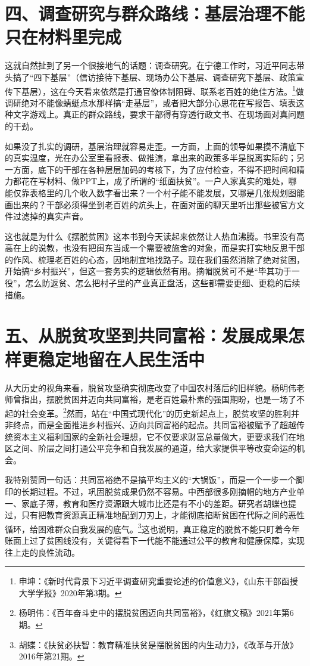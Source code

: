 \documentclass[12pt,a4paper]{ctexart}
\begin{document}
\section*{四、调查研究与群众路线：基层治理不能只在材料里完成}

这就自然扯到了另一个很接地气的话题：调查研究。在宁德工作时，习近平同志带头搞了“四下基层”（信访接待下基层、现场办公下基层、调查研究下基层、政策宣传下基层），这在今天看来依然是打通官僚体制阻碍、联系老百姓的绝佳方法。\footnote{申坤：《新时代背景下习近平调查研究重要论述的价值意义》，《山东干部函授大学学报》2020年第3期。}做调研绝对不能像蜻蜓点水那样搞“走基层”，或者把大部分心思花在写报告、填表这种文字游戏上。真正的群众路线，要求干部得有穿透行政文书、在现场面对真问题的干劲。

如果没了扎实的调研，基层治理就容易走歪。一方面，上面的领导如果摸不清底下的真实温度，光在办公室里看报表、做推演，拿出来的政策多半是脱离实际的；另一方面，底下的干部在各种层层加码的考核下，为了应付检查，不得不把时间和精力都花在写材料、做PPT上，成了所谓的“纸面扶贫”。一户人家真实的难处，哪能仅靠表格里的几个收入数字看出来？一个村子能不能发展，又哪是几张规划图能画出来的？干部必须得坐到老百姓的炕头上，在面对面的聊天里听出那些被官方文件过滤掉的真实声音。

这也就是为什么《摆脱贫困》这本书到今天读起来依然让人热血沸腾。书里没有高高在上的说教，也没有把闽东当成一个需要被施舍的对象，而是实打实地反思干部的作风、梳理老百姓的心态，因地制宜地找路子。现在我们虽然消除了绝对贫困，开始搞“乡村振兴”，但这一套务实的逻辑依然有用。摘帽脱贫可不是“毕其功于一役”，怎么防返贫、怎么把村子里的产业真正盘活，这些都需要更细、更稳的后续措施。

\section*{五、从脱贫攻坚到共同富裕：发展成果怎样更稳定地留在人民生活中}

从大历史的视角来看，脱贫攻坚确实彻底改变了中国农村落后的旧样貌。杨明伟老师曾指出，摆脱贫困并迈向共同富裕，是老百姓最朴素的强国期盼，也是一场了不起的社会变革。\footnote{杨明伟：《百年奋斗史中的摆脱贫困迈向共同富裕》，《红旗文稿》2021年第6期。}然而，站在“中国式现代化”的历史新起点上，脱贫攻坚的胜利并非终点，而是全面推进乡村振兴、迈向共同富裕的起点。共同富裕被赋予了超越传统资本主义福利国家的全新社会理想，它不仅要求财富总量做大，更要求我们在地区之间、阶层之间打通公平竞争和自我发展的通道，给大家提供平等改变命运的机会。

我特别赞同一句话：共同富裕绝不是搞平均主义的“大锅饭”，而是一个一步一个脚印的长期过程。不过，巩固脱贫成果仍然不容易。中西部很多刚摘帽的地方产业单一、家底子薄，教育和医疗资源跟大城市比还是有不小的差距。研究者胡蝶也提过，只有把教育资源真正精准地配到刀刃上，才能彻底掐断贫困在代际之间的恶性循环，给困难群众自我发展的底气。\footnote{胡蝶：《扶贫必扶智：教育精准扶贫是摆脱贫困的内生动力》，《改革与开放》2016年第21期。}这也说明，真正稳定的脱贫不能只盯着今年账面上过了贫困线没有，关键得看下一代能不能通过公平的教育和健康保障，实现往上走的良性流动。
\end{document}

